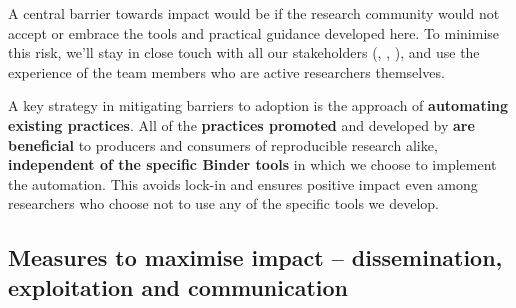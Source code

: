 A central barrier towards impact would be if the research community would not
accept or embrace the tools and practical guidance developed here.
To minimise this risk, we'll stay in close touch with all our stakeholders
(, , ), and use
the experience of the team members who are active researchers themselves.

A key strategy in mitigating barriers to adoption is the approach of \textbf{automating existing practices}.
All of the \textbf{practices promoted} and developed by \TheProject \textbf{are beneficial} to
producers and consumers of reproducible research alike,
\textbf{independent of the specific Binder tools} in which we choose to implement the automation.
This avoids lock-in and ensures positive impact even among researchers who choose not to use any of the specific tools we develop.

\subsection{Measures to maximise impact -- dissemination, exploitation and communication}


